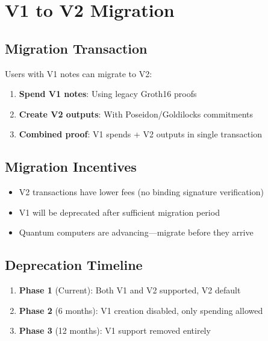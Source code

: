 \documentclass[11pt,a4paper]{article}
\begin{document}
\section{V1 to V2 Migration}

\subsection{Migration Transaction}

Users with V1 notes can migrate to V2:

\begin{enumerate}
    \item \textbf{Spend V1 notes}: Using legacy Groth16 proofs
    \item \textbf{Create V2 outputs}: With Poseidon/Goldilocks commitments
    \item \textbf{Combined proof}: V1 spends + V2 outputs in single transaction
\end{enumerate}

\subsection{Migration Incentives}

\begin{itemize}
    \item V2 transactions have lower fees (no binding signature verification)
    \item V1 will be deprecated after sufficient migration period
    \item Quantum computers are advancing---migrate before they arrive
\end{itemize}

\subsection{Deprecation Timeline}

\begin{enumerate}
    \item \textbf{Phase 1} (Current): Both V1 and V2 supported, V2 default
    \item \textbf{Phase 2} (6 months): V1 creation disabled, only spending allowed
    \item \textbf{Phase 3} (12 months): V1 support removed entirely
\end{enumerate}
\end{document}
